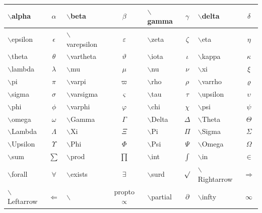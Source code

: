 \documentclass[a4paper,12pt,twoside]{article}
\begin{document}
\begin{tabular}{|l|c|l|c|l|c|l|c|}
\hline
$\backslash$alpha &$\alpha$ & $\backslash$beta & $\beta$ &
$\backslash$gamma &$\gamma$ & $\backslash$delta & $\delta$ \\
\hline

$\backslash$epsilon &$\epsilon$ & $\backslash$varepsilon & $\varepsilon$ &
$\backslash$zeta &$\zeta$ &$\backslash$eta & $\eta$ \\
\hline

$\backslash$theta&$\theta$ & $\backslash$vartheta& $\vartheta$ &
$\backslash$iota&$\iota$ &$\backslash$kappa& $\kappa$ \\
\hline

$\backslash$lambda&$\lambda$& $\backslash$mu&$\mu$ &
$\backslash$nu&$\nu$&$\backslash$xi& $\xi$ \\
\hline

$\backslash$pi&$\pi$& $\backslash$varpi&$\varpi$ &
$\backslash$rho&$\rho$& $\backslash$varrho&$\varrho$ \\
\hline

$\backslash$sigma&$\sigma$&$\backslash$varsigma& $\varsigma$&
$\backslash$tau&$\tau$& $\backslash$upsilon&$\upsilon$ \\
\hline

$\backslash$phi&$\phi$& $\backslash$varphi&$\varphi$ &
$\backslash$chi&$\chi$&$\backslash$psi& $\psi$ \\
\hline

$\backslash$omega&$\omega$&$\backslash$Gamma& $\Gamma$ &
$\backslash$Delta&$\Delta$& $\backslash$Theta&$\Theta$ \\
\hline

$\backslash$Lambda&$\Lambda$&$\backslash$Xi& $\Xi$ &
$\backslash$Pi&$\Pi$&$\backslash$Sigma& $\Sigma$ \\
\hline

$\backslash$Upsilon&$\Upsilon$&$\backslash$Phi& $\Phi$ &
$\backslash$Psi&$\Psi$& $\backslash$Omega&$\Omega$ \\
\hline

$\backslash$sum&$\sum$& $\backslash$prod&$\prod$ &
$\backslash$int&$\int$& $\backslash$in&$\in$ \\
\hline

$\backslash$forall&$\forall$&$\backslash$exists& $\exists$ &
$\backslash$surd&$\surd$&$\backslash$Rightarrow& $\Rightarrow$ \\
\hline

$\backslash$Leftarrow&$\Leftarrow$&$\backslash$&propto $\propto$ &
$\backslash$partial&$\partial$&$\backslash$infty& $\infty$ \\
\hline


\end{tabular}
\end{document}
